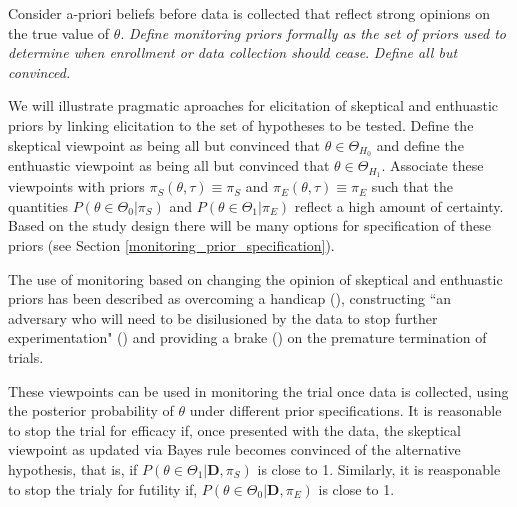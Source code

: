 \documentclass[12pt]{article}
\begin{document}
Consider a-priori beliefs before data is collected that reflect strong opinions on the true value of $\theta$. \textit{Define monitoring priors formally as the set of priors used to determine when enrollment or data collection should cease}. \textit{Define all but convinced.}

We will illustrate pragmatic aproaches for elicitation of skeptical and enthuastic priors by linking elicitation to the set of hypotheses to be tested. Define the skeptical viewpoint as being all but convinced that $\theta\in\Theta_{H_0}$ and define the enthuastic viewpoint as being all but convinced that $\theta\in\Theta_{H_1}$. Associate these viewpoints with priors $\pi_{S}(\theta,\tau)\equiv\pi_{S}$ and $\pi_{E}(\theta,\tau)\equiv\pi_{E}$ such that the quantities $P(\theta\in\Theta_0| \pi_{S})$ and $P(\theta\in\Theta_1| \pi_{E})$ reflect a high amount of certainty. Based on the study design there will be many options for specification of these priors (see Section \ref{monitoring_prior_specification}).

The use of monitoring based on changing the opinion of skeptical and enthuastic priors has been described as overcoming a handicap (\cite{Freedman1989}), constructing ``an adversary who will need to be disilusioned by the data to stop further experimentation" (\cite{Spiegelhalter1994}) and providing a brake (\cite{Fayers1997}) on the premature termination of trials.

These viewpoints can be used in monitoring the trial once data is collected, using the posterior probability of $\theta$ under different prior specifications. It is reasonable to stop the trial for efficacy if, once presented with the data, the skeptical viewpoint as updated via Bayes rule becomes convinced of the alternative hypothesis, that is, if $P(\theta\in\Theta_1|\mathbf{D}, \pi_{S})$ is close to 1. Similarly, it is reasponable to stop the trialy for futility if, $P(\theta\in\Theta_0|\mathbf{D}, \pi_{E})$ is close to 1.
\end{document}
